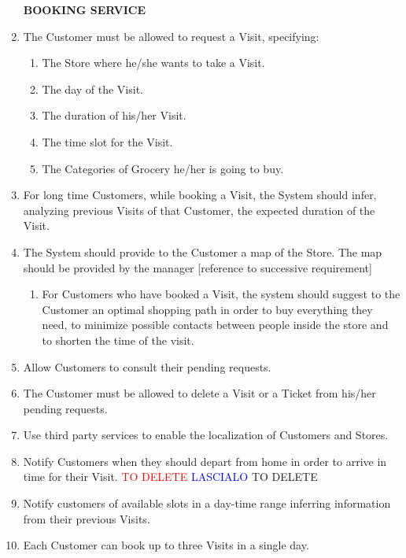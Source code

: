 \documentclass[a4paper, 10pt, oneside]{article}
\newcommand*{\lorenzo}[1]{\textcolor{BurntOrange}{#1}}
\newcommand{\yasmin}[1]{\textcolor{Red}{#1}}
\newcommand{\giovanni}[1]{\textcolor{Blue}{#1}}
\begin{document}
\begin{enumerate}[align=left]
    \item[\textbf{BOOKING SERVICE}]
    \item \label{req:requestVisit}The Customer must be allowed to request a Visit, specifying:
    \begin{enumerate}[label={-}]
        \item \label{req:requestVisit:location}The Store where he/she wants to take a Visit.
        \item \label{req:requestVisit:date}The day of the Visit.
        \item \label{req:requestVisit:duration}The duration of his/her Visit.
        \item \label{req:requestVisit:timeslot}The time slot for the Visit.
        \item \label{req:requestVisit:categoriesToBuy}The Categories of Grocery he/her is going to buy.
    \end{enumerate}
    \item \label{req:statisticForDuration}For long time Customers, while booking a Visit, the System should infer, analyzing previous Visits of that Customer, the expected duration of the Visit.
    \item \label{req:sysProvideMap}The System should provide to the Customer a map of the Store. \lorenzo{The map should be provided by the manager [reference to successive requirement]}
    \begin{enumerate}[label={-}]
        \item \label{req:sysProvideMap:suggestPath}For Customers who have booked a Visit, the system should suggest to the Customer an optimal shopping path in order to buy everything they need, to minimize possible contacts between people inside the store and to shorten the time of the visit.
    \end{enumerate}
    \item \label{req:seeRequests}Allow Customers to consult their pending requests.
    \item \label{req:deleteTickOrVis}The Customer must be allowed to delete a Visit or a Ticket from his/her pending requests.
    \item \label{req:thirdPartyGPS}Use third party services to enable the localization of Customers and Stores. 
    \item \lorenzo{Notify Customers when they should depart from home in order to arrive in time for their Visit.} \yasmin{TO DELETE} \giovanni{LASCIALO} \lorenzo{TO DELETE} %
    \item \label{req:notifyCustomerOpenSlots}Notify customers of available slots in a day-time range inferring information from their previous Visits.
    \item \label{req:visitPerDay} Each Customer can book up to three Visits in a single day.
    

\end{enumerate}
\end{document}
